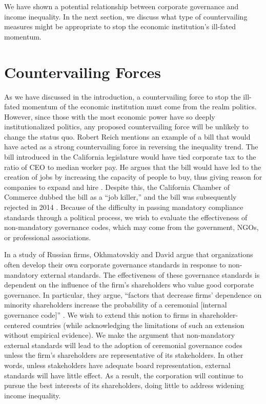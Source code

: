 \documentclass[12pt]{article}
\begin{document}
We have shown a potential relationship between corporate governance and income inequality. In the next section, we discuss what type of countervailing measures might be appropriate to stop the economic institution's ill-fated momentum.

\section{\large Countervailing Forces}
As we have discussed in the introduction, a countervailing force to stop the ill-fated momentum of the economic institution must come from the realm politics. However, since those with the most economic power have so deeply institutionalized politics, any proposed countervailing force will be unlikely to change the status quo. Robert Reich mentions an example of a bill that would have acted as a strong countervailing force in reversing the inequality trend. The bill introduced in the California legislature would have tied corporate tax to the ratio of CEO to median worker pay. He argues that the bill would have led to the creation of jobs by increasing the capacity of people to buy, thus giving reason for companies to expand and hire \cite[Reich 197]{Reich}. Despite this, the California Chamber of Commerce dubbed the bill as a ``job killer,'' and the bill was subsequently rejected in 2014 \cite[CBS/AP]{CBS}. Because of the difficulty in passing mandatory compliance standards through a political process, we wish to evaluate the effectiveness of non-mandatory governance codes, which may come from the government, NGOs, or professional associations.

In a study of Russian firms, Okhmatovskiy and David argue that organizations often develop their own corporate governance standards in response to non-mandatory external standards. The effectiveness of these governance standards is dependent on the influence of the firm's shareholders who value good corporate governance. In particular, they argue, ``factors that decrease firms' dependence on minority shareholders increase the probability of a ceremonial [internal governance code]'' \cite[Okhmatovskiy and David 170]{David}. We wish to extend this notion to firms in shareholder-centered countries (while acknowledging the limitations of such an extension without empirical evidence). We make the argument that non-mandatory external standards will lead to the adoption of ceremonial governance codes unless the firm's shareholders are representative of its stakeholders. In other words, unless stakeholders have adequate board representation, external standards will have little effect. As a result, the corporation will continue to pursue the best interests of its shareholders, doing little to address widening income inequality.  
\end{document}
